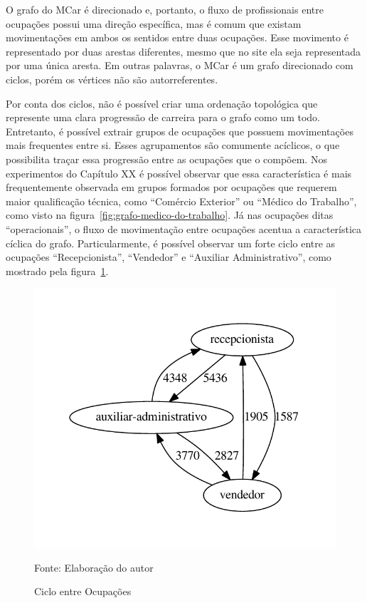 \documentclass[12pt,a4paper]{article}
\theoremstyle{hypo}
\newcommand{\source}[1]{\vspace{-10pt} \caption*{Fonte: {#1}} }
\begin{document}
O grafo do MCar é direcionado e, portanto, o fluxo de profissionais entre ocupações possui uma direção específica, mas é comum que existam movimentações em ambos os sentidos entre duas ocupações. Esse movimento é representado por duas arestas diferentes, mesmo que no site ela seja representada por uma única aresta. Em outras palavras, o MCar é um grafo direcionado com ciclos, porém os vértices não são autorreferentes.

Por conta dos ciclos, não é possível criar uma ordenação topológica que represente uma clara progressão de carreira para o grafo como um todo. Entretanto, é possível extrair grupos de ocupações que possuem movimentações mais frequentes entre si. Esses agrupamentos são comumente acíclicos, o que possibilita traçar essa progressão entre as ocupações que o compõem. Nos experimentos do Capítulo XX é possível observar que essa característica é mais frequentemente observada em grupos formados por ocupações que requerem maior qualificação técnica, como \enquote{Comércio Exterior} ou \enquote{Médico do Trabalho}, como visto na figura~\ref{fig:grafo-medico-do-trabalho}. Já nas ocupações ditas \enquote{operacionais}, o fluxo de movimentação entre ocupações acentua a característica cíclica do grafo. Particularmente, é possível observar um forte ciclo entre as ocupações \enquote{Recepcionista}, \enquote{Vendedor} e \enquote{Auxiliar Administrativo}, como mostrado pela figura~\ref{fig:grafo-ciclo-operacional}.

\begin{figure}[ht]
  \centering
  \includegraphics[scale=0.8]{ciclo-operacional.pdf}
  \caption{Ciclo entre Ocupações}
  \source{Elaboração do autor}
  \label{fig:grafo-ciclo-operacional}
\end{figure}
\end{document}
